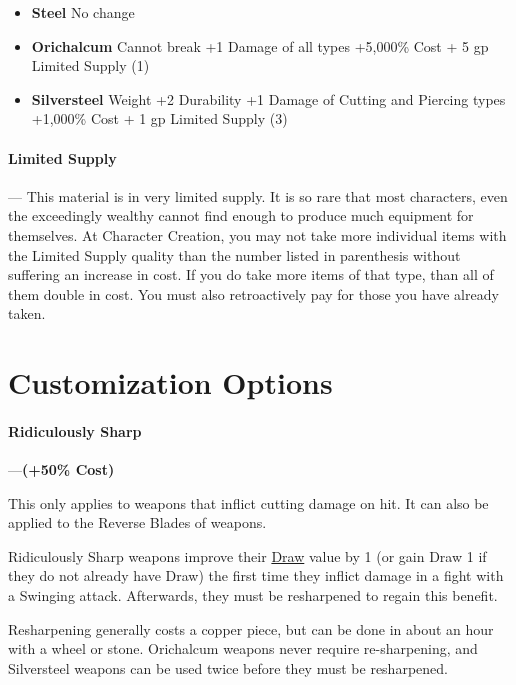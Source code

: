 \documentclass[oneside,11pt,english]{book}
\begin{document}
\begin{itemize}
\item [] \textbf{Steel}
\subitem No change
\end{itemize}
\begin{itemize}
\item [] \textbf{Orichalcum}
\subitem Cannot break
\subitem +1 Damage of all types
\subitem +5,000\% Cost + 5 gp
\subitem Limited Supply (1)
\end{itemize}
\begin{itemize}
\item [] \textbf{Silversteel}
 Weight
\subitem +2 Durability
\subitem +1 Damage of Cutting and Piercing types
\subitem +1,000\% Cost + 1 gp
\subitem Limited Supply (3)
\end{itemize}
\paragraph{Limited Supply}--- \quad
 This material is in very limited supply. It is so rare that most characters, even the exceedingly wealthy cannot find enough to produce much equipment for themselves. At Character Creation, you may not take more individual items with the Limited Supply quality than the number listed in parenthesis without suffering an increase in cost. If you do take more items of that type, than all of them double in cost. You must also retroactively pay for those you have already taken.

\section{Customization Options}
\paragraph{\label{par:Ridiculously Sharp}Ridiculously Sharp}---\quad \textbf{(+50\% Cost)}\par
This only applies to weapons that inflict cutting damage on hit. It can also be applied to the Reverse Blades of weapons.

Ridiculously Sharp weapons improve their \hyperref[wepqual:Draw]{Draw} value by 1 (or gain Draw 1 if they do not already have Draw) the first time they inflict damage in a fight with a Swinging attack. Afterwards, they must be resharpened to regain this benefit.

Resharpening generally costs a copper piece, but can be done in about an hour with a wheel or stone. Orichalcum weapons never require re-sharpening, and Silversteel weapons can be used twice before they must be resharpened.
\end{document}
